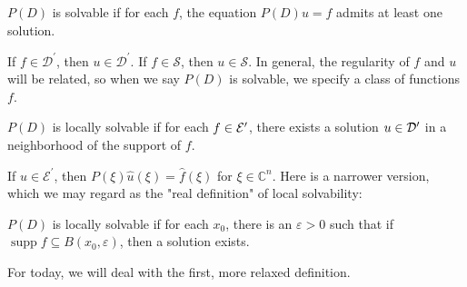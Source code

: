 \begin{definition}
    [Solvable]
    $P(D)$ is solvable if for each $f$, the equation $P(D)u=f$ admits at least one solution.
\end{definition}
If $f \in \mathcal{D}^{\prime}$, then $u \in \mathcal{D}^{\prime} .$ If $f \in \mathcal{S}$, then $u \in \mathcal{S} .$ In general, the regularity of $f$ and $u$ will be related, so when we say $P(D)$ is solvable, we specify a class of functions $f$.

\begin{definition}
$P(D)$ is locally solvable if for each $f\in \mathcal{E}'$, there exists a solution $u\in \mathcal{D}'$ in a neighborhood of the support of $f$.
\end{definition}
If $u \in \mathcal{E}^{\prime}$, then $P(\xi) \widehat{u}(\xi)=\widehat{f}(\xi)$ for $\xi \in \mathbb{C}^{n} .$ Here is a narrower version, which we may regard as the "real definition" of local solvability:

\begin{definition}
     $P(D)$ is locally solvable if for each $x_{0}$, there is an $\varepsilon>0$ such that if $\operatorname{supp} f \subseteq B\left(x_{0}, \varepsilon\right)$, then a solution exists.
\end{definition}
For today, we will deal with the first, more relaxed definition.

